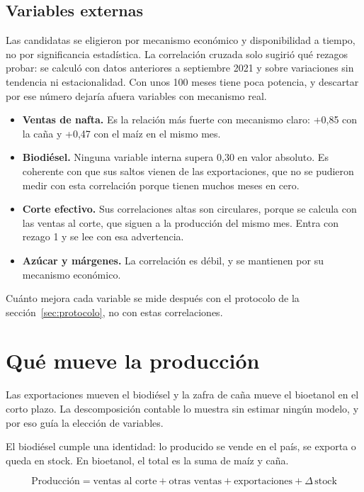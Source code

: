 \documentclass[11pt,a4paper]{article}
\begin{document}
\subsection{Variables externas}\label{sec:externas}

Las candidatas se eligieron por mecanismo económico y disponibilidad a tiempo, no por significancia estadística. La correlación cruzada solo sugirió qué rezagos probar: se calculó con datos anteriores a septiembre 2021 y sobre variaciones sin tendencia ni estacionalidad. Con unos 100 meses tiene poca potencia, y descartar por ese número dejaría afuera variables con mecanismo real.

\begin{itemize}
  \item \textbf{Ventas de nafta.} Es la relación más fuerte con mecanismo claro: +0,85 con la caña y +0,47 con el maíz en el mismo mes.
  \item \textbf{Biodiésel.} Ninguna variable interna supera 0,30 en valor absoluto. Es coherente con que sus saltos vienen de las exportaciones, que no se pudieron medir con esta correlación porque tienen muchos meses en cero.
  \item \textbf{Corte efectivo.} Sus correlaciones altas son circulares, porque se calcula con las ventas al corte, que siguen a la producción del mismo mes. Entra con rezago 1 y se lee con esa advertencia.
  \item \textbf{Azúcar y márgenes.} La correlación es débil, y se mantienen por su mecanismo económico.
\end{itemize}

Cuánto mejora cada variable se mide después con el protocolo de la sección~\ref{sec:protocolo}, no con estas correlaciones.

\section{Qué mueve la producción}

Las exportaciones mueven el biodiésel y la zafra de caña mueve el bioetanol en el corto plazo. La descomposición contable lo muestra sin estimar ningún modelo, y por eso guía la elección de variables.

El biodiésel cumple una identidad: lo producido se vende en el país, se exporta o queda en stock. En bioetanol, el total es la suma de maíz y caña.

\begin{equation*}
\text{Producción} = \text{ventas al corte} + \text{otras ventas} + \text{exportaciones} + \Delta\,\text{stock}
\end{equation*}
\end{document}
